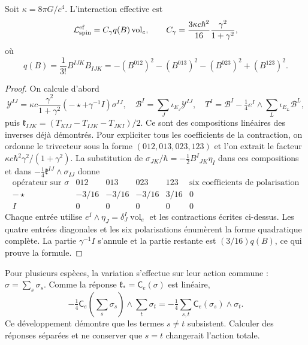 \begin{theorem}
\label{hmtcuatro:ant:coeficiente} Soit \(\kappa=8\pi G/c^4\). L’interaction effective est
\[
 \mathcal L_{\rm spin}^{\rm ef}
 =C_\gamma q(B)\operatorname{vol}_e,\qquad
 C_\gamma=\frac{3\kappa c\hbar^2}{16}
                    \frac{\gamma^2}{1+\gamma^2},
\]
où
\[
 q(B)=\frac1{3!}B^{IJK}B_{IJK}
 =-(B^{012})^2-(B^{013})^2-(B^{023})^2+(B^{123})^2 .
\]
\end{theorem}
\begin{proof}
On calcule d’abord
\[
 \mathcal Y^{IJ}
 =\kappa c\frac{\gamma^2}{1+\gamma^2}
       (-\star+\gamma^{-1}I)\sigma^{IJ},\quad
 \mathcal B^I=\sum_J\iota_{E_J}\mathcal Y^{IJ},\quad
 T^I=\mathcal B^I-\tfrac14e^I\wedge\sum_L\iota_{E_L}\mathcal B^L,
\]
puis \(\mathfrak k_{IJK}=(T_{KIJ}-T_{IJK}-T_{JKI})/2\). Ce sont des compositions linéaires des inverses déjà démontrés. Pour expliciter tous les coefficients de la contraction, on ordonne le trivecteur sous la forme \((012,013,023,123)\) et l’on extrait le facteur \(\kappa c\hbar^2\gamma^2/(1+\gamma^2)\). La substitution de \(\sigma_{JK}/\hbar=-\frac12B^I{}_{JK}\eta_I\) dans ces compositions et dans \(-\frac14\mathfrak k^{IJ}\wedge\sigma_{IJ}\) donne
\[
 \begin{array}{c|rrrr|c}
  \text{opérateur sur }\sigma&012&013&023&123&
           \text{six coefficients de polarisation}\\ \hline
  -\star&-3/16&-3/16&-3/16&3/16&0\\
  I&0&0&0&0&0
 \end{array}
\]
Chaque entrée utilise \(e^I\wedge\eta_J=\delta_J^I\operatorname{vol}_e\) et les contractions écrites ci-dessus. Les quatre entrées diagonales et les six polarisations énumèrent la forme quadratique complète. La partie \(\gamma^{-1}I\) s’annule et la partie restante est \((3/16)q(B)\), ce qui prouve la formule.
\end{proof}

Pour plusieurs espèces, la variation s’effectue sur leur action commune : \(\sigma=\sum_s\sigma_s\). Comme la réponse \(\mathfrak k_*=\mathsf C_e(\sigma)\) est linéaire,
\begin{equation}
 -\tfrac14\mathsf C_e\!\left(\sum_s\sigma_s\right)
       \wedge\sum_t\sigma_t
 =-\tfrac14\sum_{s,t}\mathsf C_e(\sigma_s)\wedge\sigma_t .
 \label{hmtcuatro:ant:cruces-especies}
\end{equation}
Ce développement démontre que les termes \(s\ne t\) subsistent. Calculer des réponses séparées et ne conserver que \(s=t\) changerait l’action totale.

